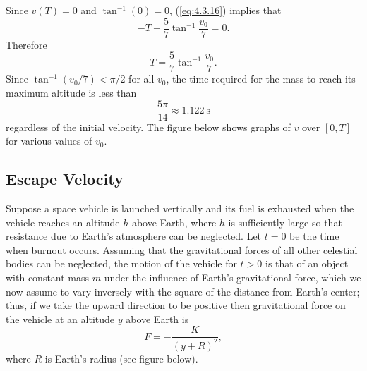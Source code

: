 \documentclass{ximera}
\begin{document}
\begin{example}
\begin{explanation}
 Since $v(T)=0$ and $\tan^{-1}(0)=0$, (\ref{eq:4.3.16}) implies that
$$
-T+\frac{5}{7} \tan^{-1}\frac{v_0}{7}=0.
$$
Therefore
$$
T=\frac{5}{7} \tan^{-1}\frac{v_0}{7}.
$$
Since $\tan^{-1}(v_0/7)<\pi/2$ for all $v_0$,
the  time required for the mass to reach its maximum
altitude is less than
$$
\frac{5\pi}{14} \approx 1.122\  \mbox{s}
$$
regardless of the initial velocity.  The figure below
shows graphs of $v$ over $[0,T]$ for various values of $v_0$.


\begin{center}
\end{center}

\end{explanation}
\end{example}
 
\subsection*{Escape Velocity}
 
Suppose a space vehicle is launched vertically and its fuel is
exhausted when the vehicle reaches an altitude $h$ above Earth, where
$h$ is sufficiently large so that resistance due to Earth's atmosphere
can be neglected. Let $t=0$ be the time when burnout occurs.
Assuming that the gravitational forces of all other celestial bodies
can be neglected, the motion of the vehicle for $t > 0$ is that of an
object with constant mass $m$ under the influence of Earth's
gravitational force, which we now assume to vary inversely with the
square of the distance from Earth's center;  thus, if we take the
upward direction to be positive then
gravitational force on the vehicle at an altitude $y$ above Earth is
\begin{equation} \label{eq:4.3.18}
F=-\frac{K}{(y+R)^2},
\end{equation}
where $R$ is  Earth's radius (see figure below).


\begin{center}
\end{center}
 
\end{document}
